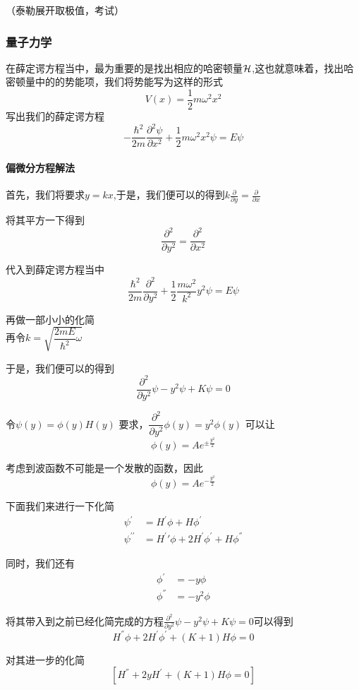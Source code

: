 \documentclass{article}
\begin{document}
（泰勒展开取极值，考试）
\subsubsection{量子力学}
在薛定谔方程当中，最为重要的是找出相应的哈密顿量$\cal H$,这也就意味着，找出哈密顿量中的的势能项，我们将势能写为这样的形式
\[
    V(x)=\frac{1}{2}m\omega^2x^2
\]
写出我们的薛定谔方程
\[
    -\frac{\hbar^2}{2m}\frac{\partial^2\psi}{\partial x^2}+\frac{1}{2}m\omega^2x^2\psi=E\psi
\]

\paragraph{偏微分方程解法}
首先，我们将要求$y=kx$,于是，我们便可以的得到$k\frac{\partial}{\partial y}=\frac{\partial}{\partial x}$

将其平方一下得到
\[
    \frac{\partial^2}{\partial y^2}=\frac{\partial^2}{\partial x^2}
\]

代入到薛定谔方程当中
\[
    \frac{\hbar^2}{2m}\frac{\partial^2}{\partial y^2}+\frac{1}{2}\frac{m\omega^2}{k^2}y^2\psi=E\psi
\]

再做一部小小的化简\\

再令$k=\sqrt{\dfrac{2mE}{\hbar^2}\omega}$

于是，我们便可以的得到
\[\frac{\partial^2}{\partial y^2} \psi -y^2\psi+K\psi=0\]

令$\psi(y)=\phi(y)H(y)$
要求，$\displaystyle \dfrac{\partial^2}{\partial y^2}\phi(y)=y^2\phi(y)$
可以让
\[\phi(y)=Ae^{\pm \frac{y^2}{2}}\]

考虑到波函数不可能是一个发散的函数，因此
\[\phi(y)=Ae^{- \frac{y^2}{2}}\]

下面我们来进行一下化简
\begin{align*}
    \psi^{\prime}&=H^\prime\phi+H\phi^\prime\\
    \psi^{\prime\prime}&=H^\prime\prime\phi+2H^{'}\phi^{'}+H\phi^{''}
\end{align*}

同时，我们还有
\begin{align*}
    \phi^{'}&=-y\phi\\
    \phi^{''}&=-y^2\phi
\end{align*}

将其带入到之前已经化简完成的方程$\displaystyle \frac{\partial^2}{\partial y^2} \psi -y^2\psi+K\psi=0$可以得到
\[H^{''}\phi+2H^{'}\phi^{'}+(K+1)H\phi=0\]

对其进一步的化简
\[\left[H^{''}+2yH^{'}+(K+1)H\phi=0\right]\]
\end{document}
